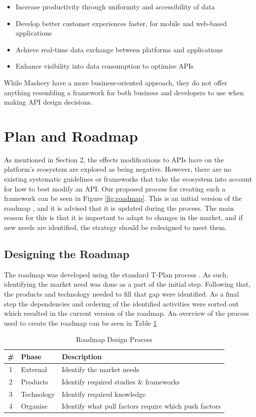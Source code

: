 \documentclass{article}
\begin{document}
\begin{itemize}
\item Increase productivity through uniformity and accessibility of data
\item Develop better customer experiences faster, for mobile and web-based applications
\item Achieve real-time data exchange between platforms and applications
\item Enhance visibility into data consumption to optimise APIs
\end{itemize}

While Mashery have a more business-oriented approach, they do not offer anything resembling a framework for both business and developers to use when making API design decisions.

\section{Plan and Roadmap}
As mentioned in Section 2, the effects modifications to APIs have on the platform’s ecosystem are explored as being negative. However, there are no existing systematic guidelines or frameworks that take the ecosystem into account for how to best modify an API. Our proposed process for creating such a framework can be seen in Figure \ref{fig:roadmap}. This is an initial version of the roadmap \cite{phaal2004technology}, and it is advised that it is updated during the process. The main reason for this is that it is important to adapt to changes in the market, and if new needs are identified, the strategy should be redesigned to meet them. 

\subsection{Designing the Roadmap}
The roadmap was developed using the standard T-Plan process \cite{phaal2004technology}. As such, identifying the market need was done as a part of the initial step. Following that, the products and technology needed to fill that gap were identified. As a final step the dependencies and ordering of the identified activities were sorted out which resulted in the current version of the roadmap. An overview of the process used to create the roadmap can be seen in Table \ref{tab:proc}

\begin{table}[ht]
\centering
\begin{tabular}[ht]{|c|l|l|}
\hline
\textbf{\#} & \textbf{Phase} & \textbf{Description} \\
\hline
1 & External & Identify the market needs \\
\hline
2 & Products & Identify required studies \& frameworks \\
\hline
3 & Technology & Identify required knowledge \\
\hline
4 & Organise & Identify what pull factors require which push factors \\
\hline
\end{tabular}
\caption{Roadmap Design Process}
\label{tab:proc}
\end{table}
\end{document}
